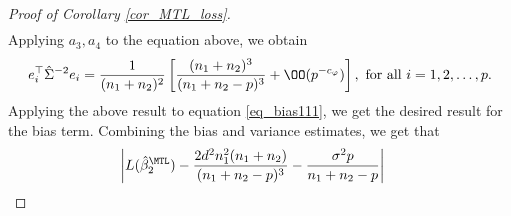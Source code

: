 \documentclass[aos,preprint]{imsart}
\begin{document}
\begin{proof}[Proof of Corollary \ref{cor_MTL_loss}]
\begin{align*}
\end{align*}
Applying $a_3, a_4$ to the equation above, we obtain
\begin{align*}%
 e_i^{\top}\hat\Sigma^{-2}e_i =  \frac{1}{(n_1+n_2)^2} \left[  \frac{ (n_1+n_2)^3 }{(n_1+n_2-p)^3} +\OO(p^{-c_\varphi})\right], \text{ for all } i = 1, 2, \dots, p.
\end{align*}
Applying the above result to equation \eqref{eq_bias111}, we get the desired result for the bias term.
Combining the bias and variance estimates, we get that
\begin{align*}
	 \left|L(\hat{\beta}_2^{\MTL})  -  \frac{2d^2 n_1^2 (n_1+n_2)}{(n_1 + n_2 - p)^3} - \frac{\sigma^2 p}{n_1+n_2-p}   \right|&

\end{align*}
\end{proof}
\end{document}
